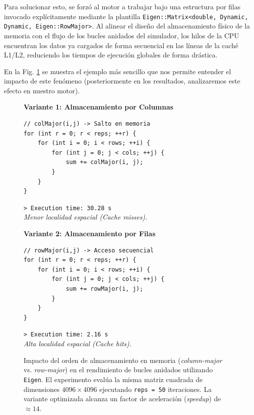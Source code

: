 \documentclass[11pt]{article}
\begin{document}
Para solucionar esto, se forzó al motor a trabajar bajo una estructura por filas invocado explícitamente mediante la plantilla \texttt{Eigen::Matrix<double, Dynamic, Dynamic, Eigen::RowMajor>}. Al alinear el diseño del almacenamiento físico de la memoria con el flujo de los bucles anidados del simulador, los hilos de la CPU encuentran los datos ya cargados de forma secuencial en las líneas de la caché L1/L2, reduciendo los tiempos de ejecución globales de forma drástica.

En la Fig. \ref{fig:comparativa_bucles} se muestra el ejemplo más sencillo que nos permite entender el impacto de este fenómeno (posteriormente en los resultados, analizaremos este efecto en nuestro motor).

\begin{figure}[htbp]
\centering
\begin{minipage}[t]{0.48\textwidth}
\centering
\small{\textbf{Variante 1: Almacenamiento por Columnas}}\\
\vspace{1mm}
\begin{lstlisting}[basicstyle=\ttfamily\footnotesize]
// colMajor(i,j) -> Salto en memoria
for (int r = 0; r < reps; ++r) {
    for (int i = 0; i < rows; ++i) {
        for (int j = 0; j < cols; ++j) {
            sum += colMajor(i, j);
        }
    }
}
\end{lstlisting}
\vspace{-2mm}
\footnotesize{\texttt{> Execution time: 30.28 s}\\ \textit{Menor localidad espacial (Cache misses).}}
\end{minipage}
\hfill
\begin{minipage}[t]{0.48\textwidth}
\centering
\small{\textbf{Variante 2: Almacenamiento por Filas}}\\
\vspace{1mm}
\begin{lstlisting}[basicstyle=\ttfamily\footnotesize]
// rowMajor(i,j) -> Acceso secuencial
for (int r = 0; r < reps; ++r) {
    for (int i = 0; i < rows; ++i) {
        for (int j = 0; j < cols; ++j) {
            sum += rowMajor(i, j);
        }
    }
}
\end{lstlisting}
\vspace{-2mm}
\footnotesize{\texttt{> Execution time: 2.16 s}\\ \textit{Alta localidad espacial (Cache hits).}}
\end{minipage}
\caption{Impacto del orden de almacenamiento en memoria (\textit{column-major} vs. \textit{row-major}) en el rendimiento de bucles anidados utilizando \texttt{Eigen}. El experimento evalúa la misma matriz cuadrada de dimensiones $4096 \times 4096$ ejecutando \texttt{reps = 50} iteraciones. La variante optimizada alcanza un factor de aceleración (\textit{speedup}) de $\approx 14$.}
\label{fig:comparativa_bucles}
\end{figure}
\end{document}
